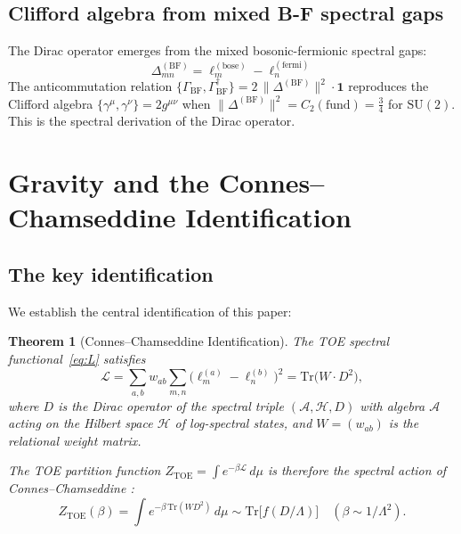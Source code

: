 \documentclass[12pt]{article}
\newtheorem{theorem}{Theorem}[section]
\theoremstyle{definition}
\theoremstyle{remark}
\newcommand{\SU}{\mathrm{SU}}
\newcommand{\Tr}{\mathrm{Tr}}
\newcommand{\TOE}{\mathrm{TOE}}
\begin{document}
\subsection{Clifford algebra from mixed B-F spectral gaps}

The Dirac operator emerges from the mixed bosonic-fermionic spectral gaps:
\begin{equation}
\Delta_{mn}^{(\mathrm{BF})} = \ell_m^{(\mathrm{bose})} - \ell_n^{(\mathrm{fermi})}
\end{equation}
The anticommutation relation
$\{\Gamma_\mathrm{BF}, \Gamma_\mathrm{BF}^\dagger\} = 2\,\|\Delta^{(\mathrm{BF})}\|^2 \cdot \mathbf{1}$
reproduces the Clifford algebra $\{\gamma^\mu, \gamma^\nu\} = 2g^{\mu\nu}$
when $\|\Delta^{(\mathrm{BF})}\|^2 = C_2(\mathrm{fund}) = \frac{3}{4}$ for $\SU(2)$.
This is the spectral derivation of the Dirac operator.

\section{Gravity and the Connes--Chamseddine Identification}
\label{sec:gravity}

\subsection{The key identification}

We establish the central identification of this paper:

\begin{theorem}[Connes--Chamseddine Identification]\label{thm:connes}
The TOE spectral functional~\eqref{eq:L} satisfies
\begin{equation}\label{eq:connes_id}
\mathcal{L}
= \sum_{a,b} w_{ab} \sum_{m,n}
  \bigl(\ell_m^{(a)} - \ell_n^{(b)}\bigr)^2
= \Tr\!\bigl(W \cdot D^2\bigr),
\end{equation}
where $D$ is the Dirac operator of the spectral triple
$(\mathcal{A}, \mathcal{H}, D)$ with algebra $\mathcal{A}$
acting on the Hilbert space $\mathcal{H}$ of log-spectral states,
and $W = (w_{ab})$ is the relational weight matrix.

The TOE partition function $Z_\TOE = \int e^{-\beta\mathcal{L}}\,d\mu$
is therefore the \emph{spectral action} of Connes--Chamseddine
\cite{ConnesChamseddine1997}:
\begin{equation}\label{eq:spec_action}
Z_\TOE(\beta)
= \int e^{-\beta\,\Tr(WD^2)}\,d\mu
\sim \Tr\bigl[f(D/\Lambda)\bigr]
\quad (\beta \sim 1/\Lambda^2).
\end{equation}
\end{theorem}
\end{document}
